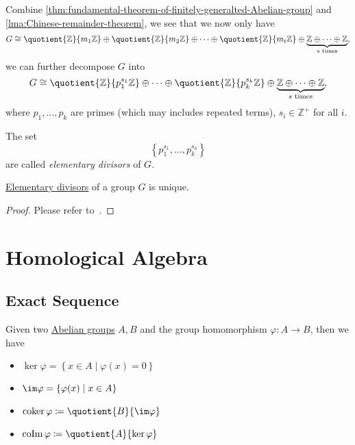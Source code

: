 Combine \autoref{thm:fundamental-theorem-of-finitely-generalted-Abelian-group} and \autoref{lma:Chinese-remainder-theorem}, we see that we now only have
\[
	G\cong \quotient{\mathbb{Z} }{m_1 \mathbb{Z} } \oplus \quotient{\mathbb{Z} }{m_2 \mathbb{Z} } \oplus \dots \oplus \quotient{\mathbb{Z} }{m_t \mathbb{Z} }  \oplus \underbrace{\mathbb{Z} \oplus \dots \oplus \mathbb{Z}  }_{s \text{ times}},
\]
we can further decompose \(G\) into
\[
	G\cong \quotient{\mathbb{Z} }{p_1^{s_1}\mathbb{Z} }\oplus \dots \oplus \quotient{\mathbb{Z} }{p_k^{s_k}\mathbb{Z} }   \oplus \underbrace{\mathbb{Z} \oplus \dots \oplus \mathbb{Z}  }_{s \text{ times}},
\]
where \(p_1, \dots , p_{k}  \) are primes (which may includes repeated terms), \(s_{i} \in \mathbb{Z} ^+\) for all \(i\).

\begin{definition}\label{def:elementary-divisors}
	The set
	\[
		\left\{p_1^{s_1}, \dots , p_{k}^{s_k} \right\}
	\]
	are called \emph{elementary divisors} of \(G\).
\end{definition}

\begin{theorem}\label{thm:uniqueness-of-elementary-divisors}
	\hyperref[def:elementary-divisors]{Elementary divisors} of a group \(G\) is unique.
\end{theorem}
\begin{proof}
	Please refer to~\cite{armstrong2013basic}.
\end{proof}

\section{Homological Algebra}\label{sec:homological-algebra}
\subsection{Exact Sequence}
\begin{prev}
	Given two \hyperref[def:Abelian-group]{Abelian groups} \(A, B\) and the group homomorphism \(\varphi\colon A\to B\), then we have
	\begin{itemize}
		\item \(\ker \varphi = \left\{x\in A\mid \varphi (x) = 0\right\}\)
		\item \(\im  \varphi = \left\{\varphi (x)\mid x\in A\right\} \)
		\item \(\operatorname{coker} \varphi \coloneqq \quotient{B}{\im  \varphi}\)
		\item \(\operatorname{coIm} \varphi \coloneqq \quotient{A}{\ker \varphi}\)
	\end{itemize}
\end{prev}

